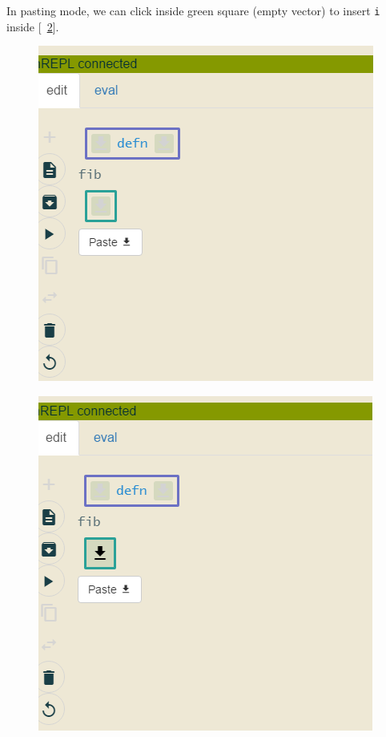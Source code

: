\documentclass[11pt]{scrartcl}
\newcommand*{\figref}[1]{[\textbf{\figurename}~\ref{#1}]}
\begin{document}
\begin{figure}[hbt]
\begin{minipage}{0.48\textwidth}
\label{fig:j-cut}
  \end{minipage}
\end{figure}

In pasting mode, we can click inside green square (empty vector) to insert
\lstinline|i| inside \figref{fig:j-i-insert}.

\begin{figure}[hbt]
  \centering
  \begin{minipage}{0.48\textwidth}
    \centering
    \includegraphics[scale=0.3]{img/j-pasting}
\label{fig:j-pasting}
  \end{minipage}
  \begin{minipage}{0.48\textwidth}
    \centering
    \includegraphics[scale=0.3]{img/j-insert-click}
\label{fig:j-i-insert}
  \end{minipage}
\end{figure}
\end{document}

